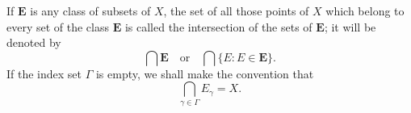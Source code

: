 If $\mathbf{E}$ is any class of subsets of $X$, the set of all those points of $X$ which belong to every set of the class $\mathbf{E}$ is called the intersection of the sets of $\mathbf{E}$; it will be denoted by
$$\bigcap \mathbf{E} \quad \text{or} \quad \bigcap \{E : E \in \mathbf{E}\}.$$
If the index set $\Gamma$ is empty, we shall make the convention that
$$\bigcap_{\gamma \in \Gamma} E_\gamma = X.$$
